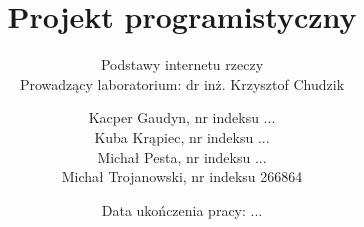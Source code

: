 \documentclass[10pt, a4paper, titlepage]{article}
\title{Projekt programistyczny}
\subtitle{
  Podstawy internetu rzeczy \\
  Prowadzący laboratorium: dr inż. Krzysztof Chudzik
}
\author{
  Kacper Gaudyn, nr indeksu ... \\
  Kuba Krąpiec, nr indeksu ... \\
  Michał Pesta, nr indeksu ... \\
  Michał Trojanowski, nr indeksu 266864
}
\date{Data ukończenia pracy: ...}
\begin{document}
  \begin{titlingpage}
    \maketitle
  \end{titlingpage}
  \tableofcontents

  \newpage
  
  
  
  
  
  
  
\end{document}
